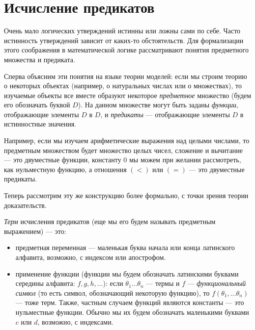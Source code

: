 \section{Исчисление предикатов}

Очень мало логических утверждений истинны или ложны сами по себе.
Часто истинность утверждений зависит от каких-то обстоятельств.
Для формализации этого соображения в математической логике рассматривают
понятия предметного множества и предиката.

Сперва объясним эти понятия на языке теории моделей:
если мы строим теорию о некоторых объектах (например, о натуральных 
числах или о множествах), то изучаемые объекты все вместе образуют 
некоторое \emph{предметное} множество (будем его обозначать буквой $D$). 
На данном множестве могут быть заданы \emph{функции}, отображающие элементы
$D$ в $D$, и \emph{предикаты} --- отображающие элементы $D$ в 
истинностные значения.

Например, если мы изучаем арифметические выражения над целыми числами, 
то предметным множеством будет множество целых чисел, сложение и 
вычитание --- это двуместные функции, константу $0$ мы можем при желании
рассмотреть, как нульместную функцию, а отношения $(<)$ или $(=)$ ---
это двуместные предикаты.

Теперь рассмотрим эту же конструкцию более формально, с точки зрения теории 
доказательств.

\begin{definition}\emph{Терм} исчисления предикатов (еще мы его будем
называть предметным выражением) --- это:
\begin{itemize}
\item предметная переменная --- маленькая буква начала или конца латинского 
алфавита, возможно, с индексом или апострофом.
\item применение функции (функции мы будем обозначать латинскими 
буквами середины алфавита: $f, g, h, \dots$):
если $\theta_1 \dots \theta_n$ --- термы и $f$ --- 
\emph{функциональный символ} (то есть символ, обозначающий некоторую
функцию), то $f (\theta_1, \dots \theta_n)$ 
--- тоже терм. Также, частным случаем функций являются константы ---
это нульместные функции. Обычно мы их будем обозначать маленькими 
буквами $c$ или $d$, возможно, с индексами.
\end{itemize}
\end{definition}


